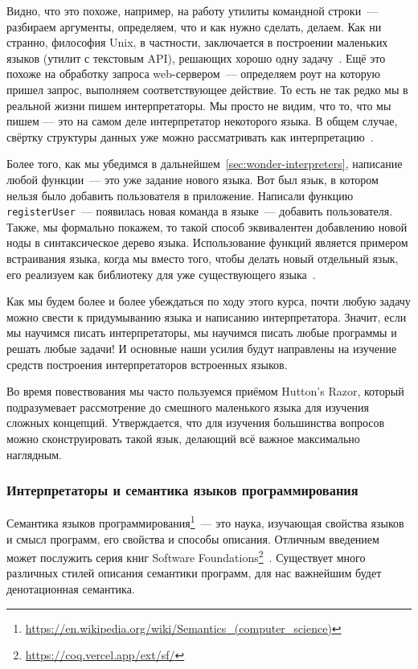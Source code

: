 Видно, что это похоже, например, на работу утилиты командной строки~--- разбираем аргументы, определяем, что и как нужно сделать, делаем.
Как ни странно, философия Unix, в частности, заключается в построении маленьких языков (утилит с текстовым API), решающих хорошо одну задачу~\cite{bentley1986little}.
Ещё это похоже на обработку запроса web-сервером~--- определяем роут на которую пришел запрос, выполняем соответствующее действие.
То есть не так редко мы в реальной жизни пишем интерпретаторы.
Мы просто не видим, что то, что мы пишем --- это на самом деле интерпретатор некоторого языка.
В общем случае, свёртку структуры данных уже можно рассматривать как интерпретацию~\cite{gibbons2014folding}.

Более того, как мы убедимся в дальнейшем~\ref{sec:wonder-interpreters}, написание любой функции~--- это уже задание нового языка.
Вот был язык, в котором нельзя было добавить пользователя в приложение.
Написали функцию \texttt{registerUser}~--- появилась новая команда в языке~--- добавить пользователя.
Также, мы формально покажем, то такой способ эквивалентен добавлению новой ноды в синтаксическое дерево языка.
Использование функций является примером встраивания языка, когда мы вместо того, чтобы делать новый отдельный язык, его реализуем как библиотеку для уже существующего языка~\cite{gibbons2013functional}.

Как мы будем более и более убеждаться по ходу этого курса, почти любую задачу можно свести к придумыванию языка и написанию интерпретатора.
Значит, если мы научимся писать интерпретаторы, мы научимся писать любые программы и решать любые задачи!
И основные наши усилия будут направлены на изучение средств построения интерпретаторов встроенных языков.

Во время повествования мы часто пользуемся приёмом Hutton's Razor, который подразумевает рассмотрение до смешного маленького языка для изучения сложных концепций.
Утверждается, что для изучения большинства вопросов можно сконструировать такой язык, делающий всё важное максимально наглядным.

\subsubsection{Интерпретаторы и семантика языков программирования} \label{subsec:semantics}

Семантика языков программирования\footnote{\url{https://en.wikipedia.org/wiki/Semantics_(computer_science)}\label{note:sema-wiki}}~--- это наука, изучающая свойства языков и смысл программ, его свойства и способы описания.
Отличным введением может послужить серия книг Software Foundations\footnote{\url{https://coq.vercel.app/ext/sf/}}~\cite{pierce2010software}.
Существует много различных стилей описания семантики программ, для нас важнейшим будет денотационная семантика.

